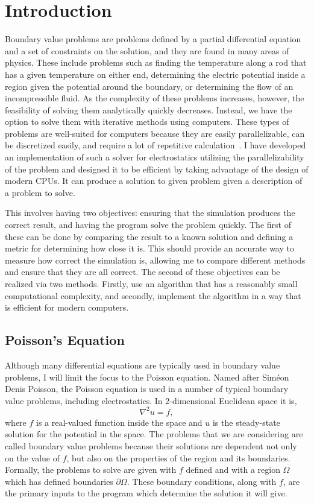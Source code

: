 \section{Introduction}


Boundary value problems are problems defined by a partial differential equation and a set of
constraints on the solution, and they are found in many areas of physics. These include problems
such as finding the temperature along a rod that has a given temperature on either end,
determining the electric potential inside a region given the potential around the
boundary, or determining the flow of an incompressible fluid. As the complexity of
these problems increases, however, the feasibility of solving them analytically
quickly decreases. Instead, we have the option to solve them with iterative methods
using computers. These types of problems are well-suited for computers because
they are easily parallelizable, can be discretized easily, and require a lot of repetitive calculation~\cite{parallel}. I have developed an
implementation of such a solver for electrostatics utilizing the 
parallelizability of the problem and designed it to be efficient by taking advantage 
of the design of modern CPUs. It can produce a solution to given problem given a description
of a problem to solve.

This involves having two objectives: ensuring that the simulation produces the correct
result, and having the program solve the problem quickly. The first of these can be done by comparing the
result to a known solution and defining a metric for determining how close it is.
This should provide an accurate way to measure how correct the simulation is, allowing
me to compare different methods and ensure that they are all correct.
The second of these objectives can be realized via two methods. Firstly, use an
algorithm that has a reasonably small computational complexity, and secondly,
implement the algorithm in a way that is efficient for modern computers.

\subsection{Poisson's Equation}

Although many differential equations are typically used in boundary value problems,
I will limit the focus to the Poisson equation. Named after Siméon Denis Poisson, the Poisson equation
is used in a number of typical boundary value problems, including electrostatics.
In 2-dimensional Euclidean space it is\cite{boas},
$$\nabla^2 u = f,$$
where $f$ is a real-valued function inside the space and $u$ is the steady-state
solution for the potential in the space. The problems that we are considering are called boundary value problems
because their solutions are dependent not only on the value of $f$, but also on the properties of the region and its boundaries.
Formally, the problems to solve are given with $f$ defined and with a region $\Omega$ which has defined boundaries
$\partial\Omega$. These boundary conditions, along with $f$, are the primary inputs to the program which determine
the solution it will give.

